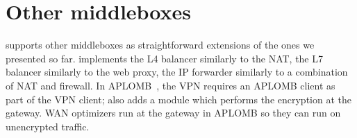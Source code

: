 
\section{Other middleboxes}\label{sec:vpn} \label{sec:other_apps} \label{sec:not_supp}\label{sec:loadb}

 \sys supports other middleboxes as straightforward extensions of the ones we presented so far. 
\sys implements the L4 balancer similarly to the NAT, the L7 balancer similarly to the web proxy, the IP forwarder similarly to a combination of NAT and firewall. 
In APLOMB~\cite{aplomb}, the VPN requires an APLOMB client as part of the VPN client; \sys also adds a module  which performs the encryption at the gateway. WAN optimizers run at the gateway in APLOMB so they can run on unencrypted traffic. 



%
%
%
%
%
%
%
%
%




